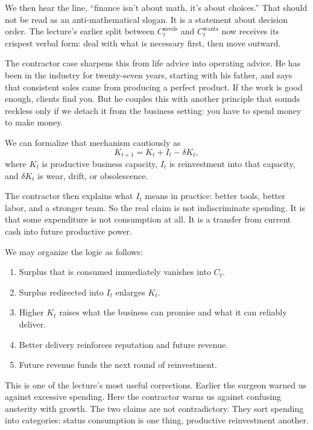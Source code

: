 We then hear the line, ``finance isn't about math, it's about choices.'' That should not be read as an anti-mathematical slogan. It is a statement about decision order. The lecture's earlier split between \(C_t^{\text{needs}}\) and \(C_t^{\text{wants}}\) now receives its crispest verbal form: deal with what is necessary first, then move outward.

The contractor case sharpens this from life advice into operating advice. He has been in the industry for twenty-seven years, starting with his father, and says that consistent sales came from producing a perfect product. If the work is good enough, clients find you. But he couples this with another principle that sounds reckless only if we detach it from the business setting: you have to spend money to make money.

We can formalize that mechanism cautiously as
\begin{equation}
K_{t+1} = K_t + I_t - \delta K_t,
\end{equation}
where \(K_t\) is productive business capacity, \(I_t\) is reinvestment into that capacity, and \(\delta K_t\) is wear, drift, or obsolescence.

The contractor then explains what \(I_t\) means in practice: better tools, better labor, and a stronger team. So the real claim is not indiscriminate spending. It is that some expenditure is not consumption at all. It is a transfer from current cash into future productive power.

We may organize the logic as follows:
\begin{enumerate}
\item Surplus that is consumed immediately vanishes into \(C_t\).
\item Surplus redirected into \(I_t\) enlarges \(K_t\).
\item Higher \(K_t\) raises what the business can promise and what it can reliably deliver.
\item Better delivery reinforces reputation and future revenue.
\item Future revenue funds the next round of reinvestment.
\end{enumerate}

This is one of the lecture's most useful corrections. Earlier the surgeon warned us against excessive spending. Here the contractor warns us against confusing austerity with growth. The two claims are not contradictory. They sort spending into categories: status consumption is one thing, productive reinvestment another.

